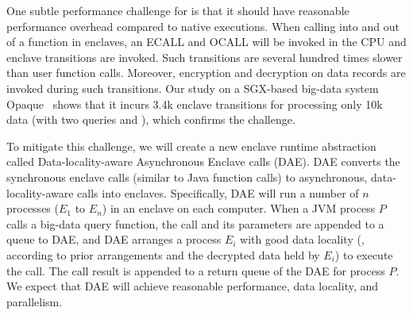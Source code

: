 One subtle performance challenge for \maat is that it should have reasonable 
performance overhead compared to native executions. When calling into and 
out of a function in enclaves, an ECALL and OCALL will be invoked in the CPU 
and enclave transitions are invoked. Such transitions are several hundred 
times slower than user function calls. Moreover, encryption and decryption on 
data records are invoked during such transitions. Our study on a SGX-based 
big-data system Opaque~\cite{opaque:nsdi17} shows that it incurs 3.4k enclave
transitions for processing only 10k data (with two queries  and 
), which confirms the challenge.





To mitigate this challenge, we will create a new enclave runtime abstraction 
called Data-locality-aware Asynchronous Enclave calls (DAE). DAE converts the 
synchronous enclave calls (similar to Java function calls) to asynchronous, 
data-locality-aware calls into enclaves. Specifically, DAE will run a number of 
$n$ processes ($E_{1}$ to $E_{n}$) in an enclave on each computer. When a 
JVM process $P$ calls a big-data query function, the call and its parameters 
are appended to a queue to DAE, and DAE arranges a process $E_{i}$ with good 
data locality (\eg, according to prior arrangements and the decrypted data 
held by $E_{i}$) to execute the call. The call result is appended to a return 
queue of the DAE for process $P$. We expect that DAE will achieve reasonable 
performance, data locality, and parallelism.


